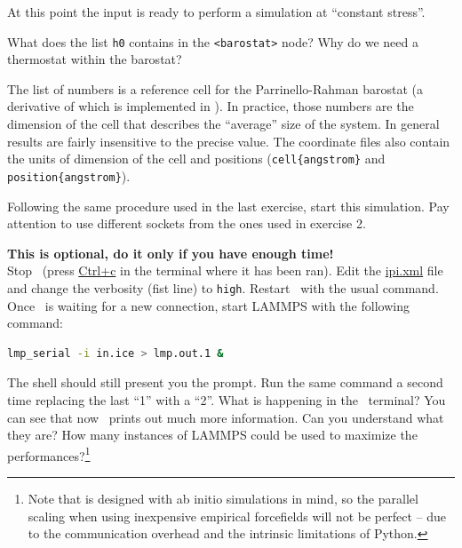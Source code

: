 \documentclass{article}
\begin{document}
\begin{Exercise}[label={inputs},title={PIMD-NPT simulation of ice}]
At this point the input is ready to perform a simulation at
``constant stress''.

\Question
What does the list \texttt{h0} contains in the \texttt{<barostat>}
node? Why do we need a thermostat 
within the barostat?

The list of numbers is a reference cell for the Parrinello-Rahman
barostat (a derivative of which is implemented in \ipi). In practice, those
numbers are the dimension of the cell that describes the ``average'' size
of the system. In general results are fairly insensitive to the precise value. 
The coordinate files
also contain the units of dimension of the cell and positions
(\texttt{cell\{angstrom\}} and \texttt{position\{angstrom\}}).

\Question
Following the same procedure used in the last exercise, start this
simulation. Pay attention to use different sockets from the ones used
in exercise 2.

\Question
\textbf{This is optional, do it only if you have enough time!}\\
Stop \ipi\ (press \url{Ctrl+c} in the terminal where it has been
ran). Edit the \url{ipi.xml} file and change the verbosity (fist line)
to \texttt{high}. Restart \ipi\ with the usual command. Once 
\ipi\ is waiting for a new connection, start LAMMPS with
the following command:
\begin{lstlisting}[language=bash]
lmp_serial -i in.ice > lmp.out.1 &
\end{lstlisting}
The shell should still present you the prompt. Run the same command a
second time replacing the last ``1'' with a ``2''. What is happening
in the \ipi\ terminal? You can see that now \ipi\ prints out much more
information. Can you understand what they are? How many instances of
LAMMPS could be used to maximize the performances?\footnote{Note that
\ipi{} is designed with ab initio simulations in mind, so the parallel
scaling when using inexpensive empirical forcefields will not be perfect --
due to the communication overhead and the intrinsic limitations of Python.}

\end{Exercise}
\end{document}

